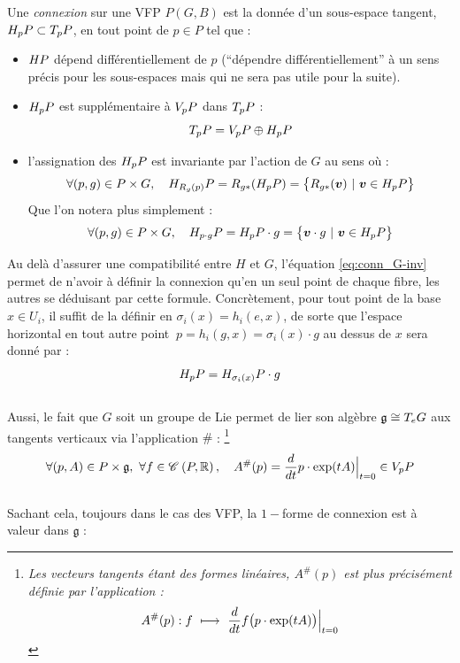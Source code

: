 \begin{definition} \label{def:connexion2VFP}
	Une \emph{connexion} sur une VFP $P(G,B)$ est la donnée d'un sous-espace tangent, $\hg[p]{P}\subset \tg[p]{P}$, en tout point de $p\in P$ tel que :
	\begin{itemize}
		
		\item $\hg{P}$ dépend différentiellement de $p$ (``dépendre différentiellement'' à un sens précis pour les sous-espaces mais qui ne sera pas utile pour la suite).
		
		\item $\hg[p]{P}$ est supplémentaire à $\vg[p]{P}$ dans $\tg[p]{P}$ :
		\begin{equation}\label{eq:TP=V+H}
			\tg[p]{P} = \vg[p]{P} \oplus \hg[p]{P}
		\end{equation}
		
		\item l'assignation des $\hg[p]{P}$ est invariante par l'action de $G$ au sens où :
		\begin{equation}\label{eq:conn_G-inv}
			\forall (p,g)\in P\times G,\quad \hg[R_g(p)]{P} = R_{g*} (\hg[p]{P}) = \big\{R_{g*}(\bf{v})\ |\ \bf{v} \in \hg[p]{P} \big\}
		\end{equation}
		Que l'on notera plus simplement :
		\begin{equation}
		\forall (p,g)\in P\times G,\quad \hg[p\cdot g]{P} = \hg[p]{P}\cdot g = \big\{\bf{v}\cdot g\ |\ \bf{v} \in \hg[p]{P} \big\}
		\end{equation}
	\end{itemize}
\end{definition}
\skipl

Au delà d'assurer une compatibilité entre $H$ et $G$, l'équation \eqref{eq:conn_G-inv} permet de n'avoir à définir la connexion qu'en un seul point de chaque fibre, les autres se déduisant par cette formule. 
Concrètement, pour tout point de la base $x\in U_i$, il suffit de la définir en $\sigma_i(x) = h_i(e, x)$, de sorte que l'espace horizontal en tout autre point $\ p=h_i(g, x) = \sigma_i(x)\cdot g$ au dessus de $x$ sera donné par :
\[\hg[p]{P} = \hg[\sigma_i(x)]{P}\cdot g\]
\\
Aussi, le fait que $G$ soit un groupe de Lie permet de lier son algèbre $\mathfrak{g}\cong \tg[e]{G}$ aux tangents verticaux via l'application $\#$ : \footnote{\itshape 
	Les vecteurs tangents étant des formes linéaires, $A^\#(p)$ est plus précisément définie par l'application :
	\[A^\#(p) : f\ \lmt\  \frac{d}{dt} f\big( p\cdot \exp(tA) \big)\Big|_{t=0}\]}
\begin{equation} \label{eq:alg2vg}
	\forall (p,A)\in P\times \mathfrak{g},\ \forall f\in\conti{P}{\R},\quad A^\#(p) = \frac{d}{dt} p\cdot \exp(tA) \Big|_{t=0}\in\vg[p]{P}
\end{equation}
\\
Sachant cela, toujours dans le cas des VFP, la $1-$forme de connexion est à valeur dans $\mathfrak{g}$ :

